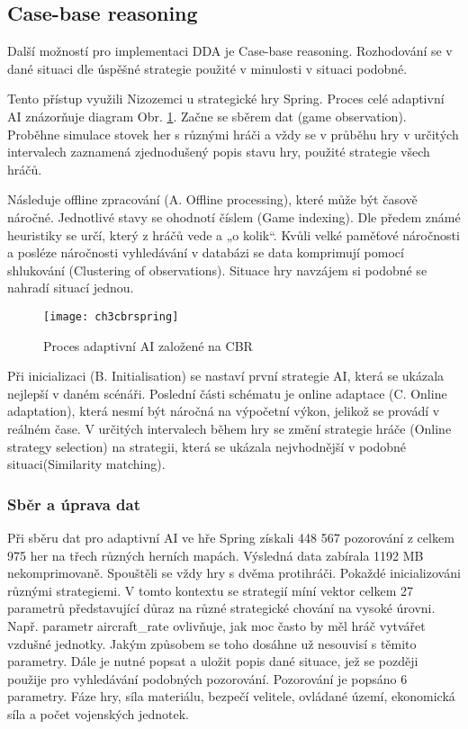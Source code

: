\subsection{Case-base reasoning}

Další možností pro implementaci DDA je Case-base reasoning. Rozhodování se v dané situaci dle úspěšné strategie použité v minulosti v situaci podobné.

Tento přístup využili Nizozemci u strategické hry Spring. \cite{21cbr} Proces celé adaptivní AI znázorňuje diagram Obr. \ref{fig:ch3cbrspring}.
Začne se sběrem dat (game observation). Proběhne simulace stovek her s různými hráči a vždy se v průběhu hry v určitých intervalech zaznamená zjednodušený popis stavu hry, použité strategie všech hráčů. 

Následuje offline zpracování (A. Offline processing), které může být časově náročné. Jednotlivé stavy se ohodnotí číslem (Game indexing). Dle předem známé heuristiky se určí, který z hráčů vede a „o kolik“. Kvůli velké paměťové náročnosti a posléze náročnosti vyhledávání v databázi se data komprimují pomocí shlukování (Clustering of observations). Situace hry navzájem si podobné se nahradí situací jednou.
 
\begin{figure}
  \centering
  \texttt{[image: ch3cbrspring]}
	\caption{Proces adaptivní AI založené na CBR \cite{21cbr}}
	\label{fig:ch3cbrspring}
\end{figure}

Při inicializaci (B. Initialisation) se nastaví první strategie AI, která se ukázala nejlepší v daném scénáři. Poslední části schématu je online adaptace (C. Online adaptation), která nesmí být náročná na výpočetní výkon, jelikož se provádí v reálném čase. V určitých intervalech během hry se změní strategie hráče (Online strategy selection) na strategii, která se ukázala nejvhodnější v podobné situaci(Similarity matching).

\subsubsection{Sběr a úprava dat}

Při sběru dat pro adaptivní AI ve hře Spring získali 448 567 pozorování z celkem 975 her na třech různých herních mapách. Výsledná data zabírala 1192 MB nekomprimovaně. Spouštěli se vždy hry s dvěma protihráči. Pokaždé inicializováni různými strategiemi. V tomto kontextu se strategií míní vektor celkem 27 parametrů představující důraz na různé strategické chování na vysoké úrovni. Např. parametr aircraft\_rate ovlivňuje, jak moc často by měl hráč vytvářet vzdušné jednotky. Jakým způsobem se toho dosáhne už nesouvisí s těmito parametry. Dále je nutné popsat a uložit popis dané situace, jež se později použije pro vyhledávání podobných pozorování. Pozorování je popsáno 6 parametry. Fáze hry, síla materiálu, bezpečí velitele, ovládané území, ekonomická síla a počet vojenských jednotek.

